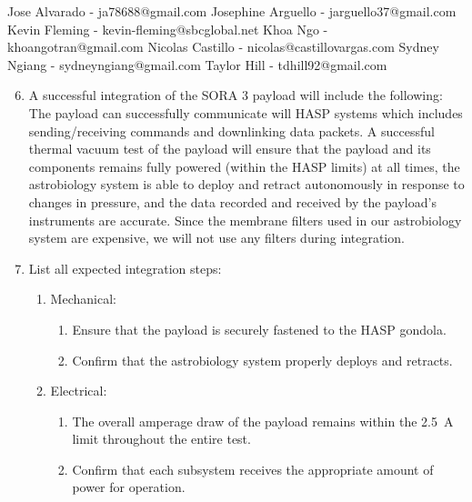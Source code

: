 \begin{minipage}{\linewidth-0.5cm}
\begin{enumerate}[label = \Alph*.]
    Jose Alvarado - ja78688@gmail.com \newline
    Josephine Arguello - jarguello37@gmail.com \newline
    Kevin Fleming - kevin-fleming@sbcglobal.net \newline
    Khoa Ngo - khoangotran@gmail.com \newline
    Nicolas Castillo - nicolas@castillovargas.com \newline
    Sydney Ngiang - sydneyngiang@gmail.com \newline
    Taylor Hill - tdhill92@gmail.com \newline    
  \end{enumerate}
\end{minipage}
\newpage
\begin{minipage}{\linewidth-0.5cm}
  \begin{enumerate}[label = \Alph*.] \setcounter{enumi}{5}
  \item A successful integration of the SORA 3 payload will include the following: \newline
    The payload can successfully communicate will HASP systems which includes sending/receiving commands and downlinking data packets. A successful thermal vacuum test of the payload will ensure that the payload and its components remains fully powered (within the HASP limits) at all times, the astrobiology system is able to deploy and retract autonomously in response to changes in pressure, and the data recorded and received by the payload's instruments are accurate. Since the membrane filters used in our astrobiology system are expensive, we will not use any filters during integration.    
  \item List all expected integration steps:
    \begin{enumerate}[label = -]
    \item Mechanical:
      \begin{enumerate}
      \item Ensure that the payload is securely fastened to the HASP gondola.
      \item Confirm that the astrobiology system properly deploys and retracts.
      \end{enumerate}
    \item Electrical:
      \begin{enumerate}
      \item The overall amperage draw of the payload remains within the \SI{2.5}{\ampere} limit throughout the entire test.
      \item Confirm that each subsystem receives the appropriate amount of power for operation.

\end{enumerate}
\end{enumerate}
\end{enumerate}
\end{minipage}
